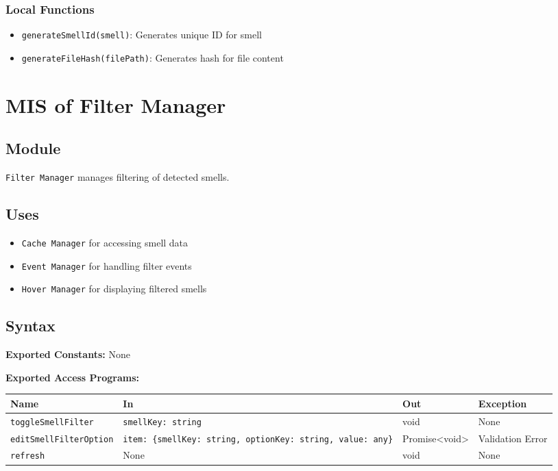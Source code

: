 \documentclass[12pt, titlepage]{article}
\begin{document}
\subsubsection{Local Functions}
\begin{itemize}
\item \texttt{generateSmellId(smell)}: Generates unique ID for smell
\item \texttt{generateFileHash(filePath)}: Generates hash for file content
\end{itemize}

\section{MIS of Filter Manager}

\subsection{Module}
\texttt{Filter Manager} manages filtering of detected smells.

\subsection{Uses}
\begin{itemize}
\item \texttt{Cache Manager} for accessing smell data
\item \texttt{Event Manager} for handling filter events
\item \texttt{Hover Manager} for displaying filtered smells
\end{itemize}

\subsection{Syntax}

\textbf{Exported Constants:} None

\textbf{Exported Access Programs:}\\
\begin{tabularx}{\linewidth}{|l|>{\raggedright\arraybackslash}X|l|l|}
  \hline
  \textbf{Name} & \textbf{In} & \textbf{Out} & \textbf{Exception} \\
  \hline
  \texttt{toggleSmellFilter} & \texttt{smellKey: string} & void & None \\ \hline
  \texttt{editSmellFilterOption} & \texttt{item: \{smellKey: string, optionKey: string, value: any\}} & Promise<void> & Validation Error \\ \hline
  \texttt{refresh} & None & void & None \\
  \hline
\end{tabularx}
\end{document}

